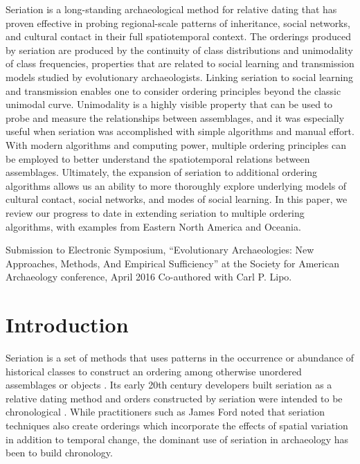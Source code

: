 \begin{description}[leftmargin=-1\labelwidth]
\item[\textsc{Abstract}] Seriation is a long-standing archaeological method for relative dating that has proven effective in probing regional-scale patterns of inheritance, social networks, and cultural contact in their full spatiotemporal context. The orderings produced by seriation are produced by the continuity of class distributions and unimodality of class frequencies, properties that are related to social learning and transmission models studied by evolutionary archaeologists. Linking seriation to social learning and transmission enables one to consider ordering principles beyond the classic unimodal curve. Unimodality is a highly visible property that can be used to probe and measure the relationships between assemblages, and it was especially useful when seriation was accomplished with simple algorithms and manual effort. With modern algorithms and computing power, multiple ordering principles can be employed to better understand the spatiotemporal relations between assemblages. Ultimately, the expansion of seriation to additional ordering algorithms allows us an ability to more thoroughly explore underlying models of cultural contact, social networks, and modes of social learning. In this paper, we review our progress to date in extending seriation to multiple ordering algorithms, with examples from Eastern North America and Oceania.

\item[\textsc{Source}]  Submission to Electronic Symposium, ``Evolutionary Archaeologies: New Approaches, Methods, And Empirical
Sufficiency'' at the Society for American Archaeology conference, April 2016  Co-authored with Carl P. Lipo.  
\end{description}


\section{Introduction}\label{introduction}

Seriation is a set of methods that uses patterns in the occurrence or
abundance of historical classes to construct an ordering among otherwise
unordered assemblages or objects \citep{Dunnell:1970aa}. Its early 20th
century developers built seriation as a relative dating method and
orders constructed by seriation were intended to be chronological
\citep{o2000applying, o1998james, Lyman:2006aa, OBrien1999b, lyman1997rise}.
While practitioners such as James Ford
\citep{Ford:1938aa, Phillips1951, Ford:1935aa} noted that seriation
techniques also create orderings which incorporate the effects of
spatial variation in addition to temporal change, the dominant use of
seriation in archaeology has been to build chronology.

